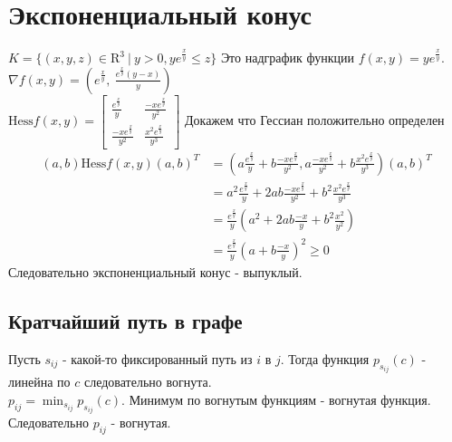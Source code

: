 \documentclass[12pt]{exam}
\begin{document}
\section*{Экспоненциальный конус}
$K = \{ (x, y, z) \in \mathrm{R}^3 \:|\: y > 0, y e^{\frac{x}{y}} \leq z\} $
Это надграфик функции $f(x, y) = y e ^{\frac{x}{y}}$.\\
$\nabla f(x, y) = \left(e ^ \frac{x}{y},\: \frac{e^\frac{x}{y} (y - x)}{y} \right)$ \\
$
\mathrm{Hess} f(x, y) = 
\begin{bmatrix}
    \frac{e^\frac{x}{y}}{y} & \frac{-x e^\frac{x}{y}}{y^2} \\ 
    \frac{-x e^\frac{x}{y}}{y^2} & \frac{x^2 e^\frac{x}{y}}{y^3} 
\end{bmatrix}
$
Докажем что Гессиан положительно определен
\begin{align*}
    (a, b) \mathrm{Hess} f(x, y) (a, b)^T 
        &= \left(
        a \frac{e^\frac{x}{y}}{y} + b \frac{-x e^\frac{x}{y}}{y^2}, 
        a \frac{-x e^\frac{x}{y}}{y^2} + b \frac{x^2 e^\frac{x}{y}}{y^3}
        \right) (a, b)^T \\
        &= a^2 \frac{e^\frac{x}{y}}{y} + 2ab \frac{-x e^\frac{x}{y}}{y^2} + b^2 \frac{x^2 e^\frac{x}{y}}{y^3} \\
        &= \frac{e^\frac{x}{y}}{y} \left( a^2 + 2ab \frac{-x}{y} + b^2 \frac{x^2}{y^2} \right) \\
        &= \frac{e^\frac{x}{y}}{y} \left( a + b\frac{-x}{y} \right)^2 \geq 0
\end{align*}
Следовательно экспоненциальный конус - выпуклый.

\subsection*{Кратчайший путь в графе}
Пусть $s_{ij}$ - какой-то фиксированный путь из $i$ в $j$.
Тогда функция $p_{s_{ij}}(c)$ - линейна по $c$ следовательно вогнута. \\
$p_{ij} = \min_{s_{ij}} p_{s_{ij}}(c)$. Минимум по вогнутым функциям - вогнутая функция.\\
Следовательно $p_{ij}$ - вогнутая.
\end{document}
